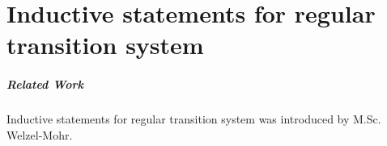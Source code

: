 \chapter{Inductive statements for regular transition system}\label{chapter:inductive_statement}
\paragraph*{Related Work}
\paragraph*{}
Inductive statements for regular transition system was introduced by M.Sc. Welzel-Mohr.
